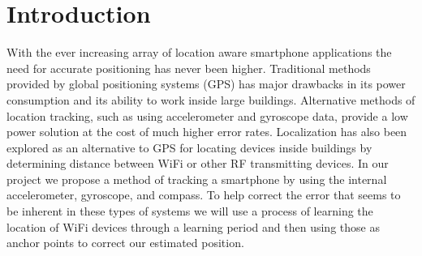 \section{Introduction}
\label{sec:intro}

With the ever increasing array of location aware smartphone applications the need for accurate positioning has never been higher. Traditional methods provided by global positioning systems (GPS) has major drawbacks in its power consumption and its ability to work inside large buildings. Alternative methods of location tracking, such as using accelerometer and gyroscope data, provide a low power solution at the cost of much higher error rates. Localization has also been explored as an alternative to GPS for locating devices inside buildings by determining distance between WiFi or other RF transmitting devices. In our project we propose a method of tracking a smartphone by using the internal accelerometer, gyroscope, and compass. To help correct the error that seems to be inherent in these types of systems we will use a process of learning the location of WiFi devices through a learning period and then using those as anchor points to correct our estimated position.
